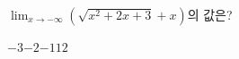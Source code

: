 $\displaystyle\lim_{x\to -\infty}(\sqrt{x^2+2x+3}+x)$의 값은?
\begin{choices32}{$-3$}{$-2$}{$-1$}{$1$}{$2$}\end{choices32}
